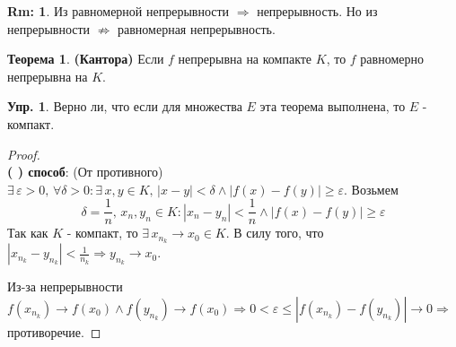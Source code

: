 \documentclass[12pt]{article}
\newcommand{\RN}[1]{%
	\textup{\uppercase\expandafter{\romannumeral#1}}%
}
\newcommand{\VE}{\varepsilon}
\theoremstyle{definition}
\newtheorem{rem}{Rm:}
\newtheorem{exrc}{Упр.}
\newtheorem{theorem}{Теорема}
\begin{document}
\begin{rem}
	Из равномерной непрерывности $\Rightarrow$ непрерывность. Но из непрерывности $ \nRightarrow$ равномерная непрерывность.
\end{rem}

\begin{theorem} \textbf{(Кантора)}
	Если $f$ непрерывна на компакте $K$, то $f$ равномерно непрерывна на $K$.
\end{theorem}

\begin{exrc}
	Верно ли, что если для множества $E$ эта теорема выполнена, то $E$ - компакт.
\end{exrc}

\begin{proof}\hfill\\
	\textbf{(\RN{1}) способ}: (От противного) $\exists \, \VE >0, \, \forall \delta > 0 \colon \exists \, x,y \in K, \, |x-y| < \delta \wedge |f(x) - f(y)| \geq \VE$. Возьмем 
	$$\delta = \frac{1}{n}, \, x_n, y_n \in K \colon |x_n - y_n| < \frac{1}{n} \wedge |f(x) - f(y)| \geq \VE$$ 
	Так как $K$ - компакт, то $\exists \, x_{n_k} \to x_0 \in K$. В силу того, что $|x_{n_k} - y_{n_k}| < \frac{1}{n_k} \Rightarrow y_{n_k} \to x_0$.
	
	Из-за непрерывности $f(x_{n_k}) \to f(x_0) \wedge f(y_{n_k}) \to f(x_0) \Rightarrow 0 < \VE \leq |f(x_{n_k}) - f(y_{n_k})| \to 0 \Rightarrow$ противоречие.
	

\end{proof}
\end{document}
